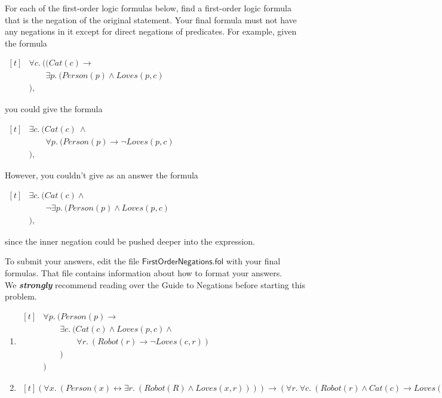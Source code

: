 \documentclass{article}
\renewcommand{\(}{\left(}
\renewcommand{\)}{\right)}
\theoremstyle{plain}
\theoremstyle{plain}
\theoremstyle{definition}
\renewcommand{\emph}[1]{\textit{\textbf{#1}}}
\begin{document}
For each of the first-order logic formulas below,
find a first-order logic formula that is the negation of the
original statement.
Your final formula must not have any negations in it
except for direct negations of predicates.
For example,
given the formula
\begin{center}
$\begin{aligned}[t]
&\forall c.\ ((Cat(c) \rightarrow \\
&\qquad \exists p.\ (Person(p) \land Loves(p,c)\\
&),
\end{aligned}$
\end{center}

you could give the formula

\begin{center}
$\begin{aligned}[t]
&\exists c.\ (Cat(c) \ \land\\
&\qquad \forall p.\ (Person(p) \rightarrow \neg Loves(p,c)\\
&),
\end{aligned}$
\end{center}

However, you couldn't give as an answer the formula

\begin{center}
$\begin{aligned}[t]
&\exists c.\ (Cat(c) \land\\
&\qquad \neg \exists p.\ (Person(p) \land Loves(p,c)\\
&),
\end{aligned}$
\end{center}

since the inner negation could be pushed deeper into the expression.

To submit your answers, edit the file $\mathsf{FirstOrderNegations.fol}$ with your final formulas. That file contains information about how to format your answers.\\

We \emph{strongly} recommend reading
over the Guide to Negations before starting this problem.



\begin{enumerate}[label*=\roman*.,ref=\roman*]
\item
$\begin{aligned}[t]
&\forall p.\ (Person(p) \rightarrow\\
&\qquad \exists c.\ (Cat(c) \land Loves(p,c) \land\\
&\qquad \qquad \forall r.\ (Robot(r) \rightarrow \neg Loves(c, r))\\
&\qquad )\\
&)
\end{aligned}$

\item
$\begin{aligned}[t]
(\forall x.\ (Person(x) \leftrightarrow \exists r.\ (Robot(R) \land Loves(x, r)))) \rightarrow (\forall r.\ \forall c.\ (Robot(r) \land Cat(c) \rightarrow Loves(r,c)))
\end{aligned}$

\end{enumerate}
\end{document}
